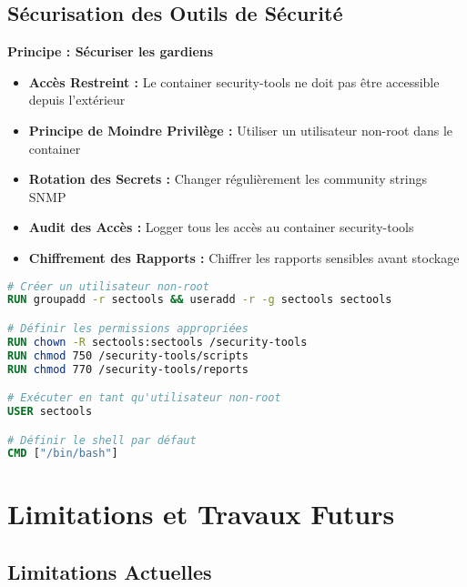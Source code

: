 \subsection{Sécurisation des Outils de Sécurité}

\textbf{Principe : Sécuriser les gardiens}

\begin{itemize}
    \item \textbf{Accès Restreint :} Le container security-tools ne doit pas être accessible depuis l'extérieur
    \item \textbf{Principe de Moindre Privilège :} Utiliser un utilisateur non-root dans le container
    \item \textbf{Rotation des Secrets :} Changer régulièrement les community strings SNMP
    \item \textbf{Audit des Accès :} Logger tous les accès au container security-tools
    \item \textbf{Chiffrement des Rapports :} Chiffrer les rapports sensibles avant stockage
\end{itemize}

\begin{lstlisting}[language=Dockerfile, caption=Sécurisation du Container, basicstyle=\ttfamily\tiny]
# Créer un utilisateur non-root
RUN groupadd -r sectools && useradd -r -g sectools sectools

# Définir les permissions appropriées
RUN chown -R sectools:sectools /security-tools
RUN chmod 750 /security-tools/scripts
RUN chmod 770 /security-tools/reports

# Exécuter en tant qu'utilisateur non-root
USER sectools

# Définir le shell par défaut
CMD ["/bin/bash"]
\end{lstlisting}

\section{Limitations et Travaux Futurs}

\subsection{Limitations Actuelles}

